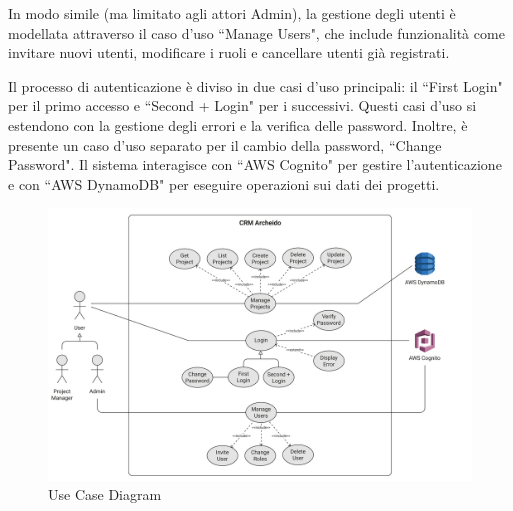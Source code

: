 \documentclass[target=bach,aauheader=,style=]{thud}
\begin{document}
\noindent In modo simile (ma limitato agli attori Admin), la gestione degli utenti è modellata attraverso il caso d'uso ``Manage Users", che include funzionalità come invitare nuovi utenti, modificare i ruoli e cancellare utenti già registrati. 

\noindent Il processo di autenticazione è diviso in due casi d'uso principali: il ``First Login" per il primo accesso e ``Second + Login" per i successivi. Questi casi d'uso si estendono con la gestione degli errori e la verifica delle password. Inoltre, è presente un caso d'uso separato per il cambio della password, ``Change Password". Il sistema interagisce con ``AWS Cognito" per gestire l'autenticazione e con ``AWS DynamoDB" per eseguire operazioni sui dati dei progetti.

\begin{figure}[H]
    \centering
    \includegraphics[width=1\textwidth]{img/diagrammi/use_case.pdf} 
    \caption{Use Case Diagram}
\end{figure}
\end{document}
